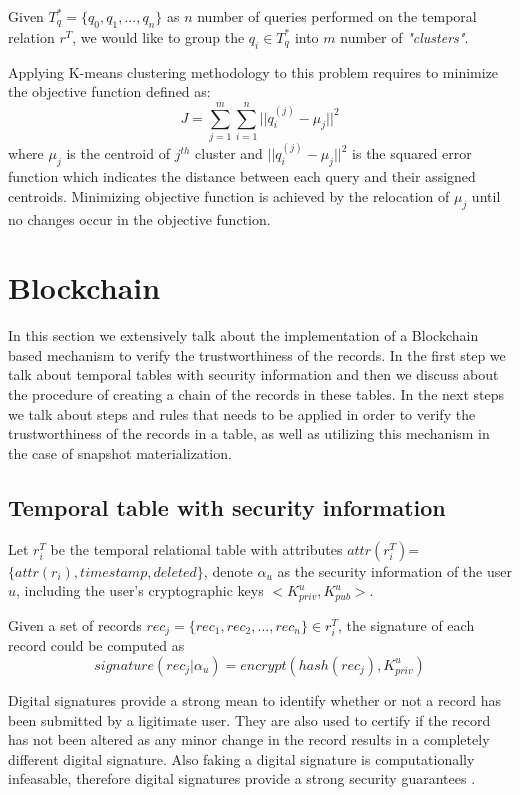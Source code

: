 			\begin{prop} 
				Given $T_q^* = \{q_0,q_1,...,q_n\}$ as $n$ number of queries performed on the temporal relation $r^T$, we would like to group the $q_i \in T_q^*$ into $m$ number of \textit{"clusters"}. 
			\label{prop:heuristic_method}
			\end{prop}
			Applying K-means clustering methodology to this problem requires to minimize the objective function defined as:
			$$J = \sum_{j=1}^{m} \sum_{i=1}^{n} ||q_i^{(j)}-\mu_j||^2$$
			where $\mu_j$ is the centroid of $j^{th}$ cluster and $||q_i^{(j)}-\mu_j||^2$ is the squared error function which indicates the distance between each query and their assigned centroids.
			Minimizing objective function is achieved by the relocation of $\mu_j$ until no changes occur in the objective function.

	\section{Blockchain} \label{sec:blockchain}
		In this section we extensively talk about the implementation of a Blockchain based mechanism to verify the trustworthiness of the records. In the first step we talk about temporal tables with security information and then we discuss about the procedure of creating a chain of the records in these tables. In the next steps we talk about steps and rules that needs to be applied in order to verify the trustworthiness of the records in a table, as well as utilizing this mechanism in the case of snapshot materialization.

		\subsection{Temporal table with security information} \label{sec:temporal_with_security}
			Let $r_i^T$ be the temporal relational table with attributes $attr(r_i^T)$=$\{attr(r_i), timestamp,deleted\}$, denote $\alpha_u$ as the security information of the user $u$, including the user's cryptographic keys $<K_{priv}^u, K_{pub}^u>$.


			\begin{defn} 
				Given a set of records $rec_j =\{rec_1,rec_2,...,rec_n\} \in r_i^T$, the signature of each record could be computed as $$signature(rec_j|\alpha_u)= encrypt(hash(rec_j),K_{priv}^u)$$  
			\label{defn:digital_signature}
			\end{defn}

			Digital signatures provide a strong mean to identify whether or not a record has been submitted by a ligitimate user. They are also used to certify if the record has not been altered as any minor change in the record results in a completely different digital signature. Also faking a digital signature is computationally infeasable, therefore digital signatures provide a strong security guarantees \cite{katz2010digital}.

